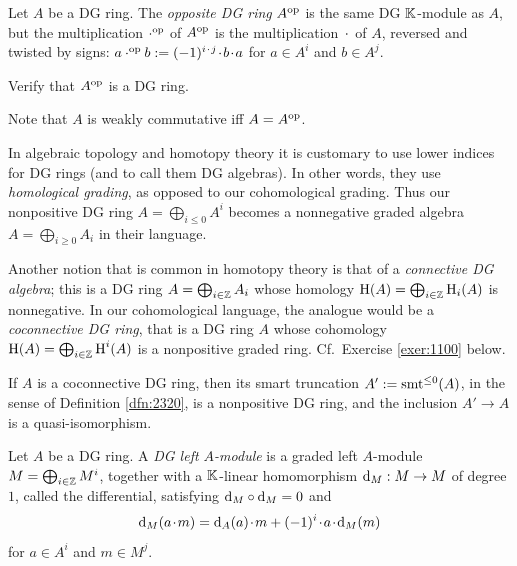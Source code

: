 \begin{dfn} \label{dfn:1080}
Let $A$ be a DG ring. The {\em opposite DG ring}
$A^{\mathrm{op}}$
is the same DG $\mathbb{K}$-module as $A$, but the multiplication $\cdot^{\mathrm{op}}$ of 
$A^{\mathrm{op}}$ is the multiplication $\mspace{1.5mu}{\cdot}\mspace{1.5mu}$ of $A$, reversed and twisted by 
signs: 
$a \cdot^{\mathrm{op}}  b := (-1)^{i \mspace{1.5mu}{\cdot}\mspace{1.5mu} j} \mspace{1.5mu}{\cdot}\mspace{1.5mu} b \mspace{1.5mu}{\cdot}\mspace{1.5mu} a$
for $a \in A^i$ and $b \in A^j$. 
\end{dfn}

\begin{exer} \label{exer:2500}
Verify that $A^{\mathrm{op}}$ is a DG ring. 
\end{exer}

Note that $A$ is weakly commutative iff $A = A^{\mathrm{op}}$. 

\begin{rem} \label{rem:4130}
In algebraic topology and homotopy theory it is customary to use lower indices 
for DG rings (and to call them DG algebras). In other words, they use {\em 
homological grading}, as opposed to our cohomological grading. Thus our 
nonpositive DG ring $A =  \bigoplus_{i \leq 0} A^i$ becomes a nonnegative 
graded algebra $A =  \bigoplus_{i \geq 0} A_i$ in their language. 

Another notion that is common in homotopy theory is that of a 
{\em connective DG algebra}; this is a DG ring 
$A =  \bigoplus_{i \in \mathbb{Z}} A_i$
whose homology $\operatorname{H}(A) = \bigoplus_{i \in \mathbb{Z}} \operatorname{H}_i(A)$
is nonnegative. In our cohomological language, the analogue would be a 
{\em coconnective DG ring}, that is a DG ring $A$ whose cohomology 
$\operatorname{H}(A) = \bigoplus_{i \in \mathbb{Z}} \operatorname{H}^i(A)$
is a nonpositive graded ring. Cf.\ Exercise \ref{exer:1100} below. 

If $A$ is a coconnective DG ring, then its smart truncation  
$A' := \operatorname{smt}^{\leq 0}(A)$, in the sense of Definition \ref{dfn:2320}, 
is a nonpositive DG ring, and the inclusion $A' \to A$ is a quasi-isomorphism. 
\end{rem}

\begin{dfn} \label{dfn:1081}
Let $A$ be a DG ring. A {\em DG left $A$-module}
is a graded left $A$-module $M = \bigoplus_{i \in \mathbb{Z}} M^i$, together with a 
$\mathbb{K}$-linear homomorphism $\mathrm{d}_M : M \to M$ of degree $1$, called the 
differential, satisfying $\mathrm{d}_M \circ \mathrm{d}_M = 0$ and 
\[ \mathrm{d}_M(a \mspace{1.5mu}{\cdot}\mspace{1.5mu} m) =  \mathrm{d}_A(a) \mspace{1.5mu}{\cdot}\mspace{1.5mu} m + (-1)^i \mspace{1.5mu}{\cdot}\mspace{1.5mu} a \mspace{1.5mu}{\cdot}\mspace{1.5mu} \mathrm{d}_M(m) \]
for $a \in A^i$ and $m \in M^j$.
\end{dfn}

